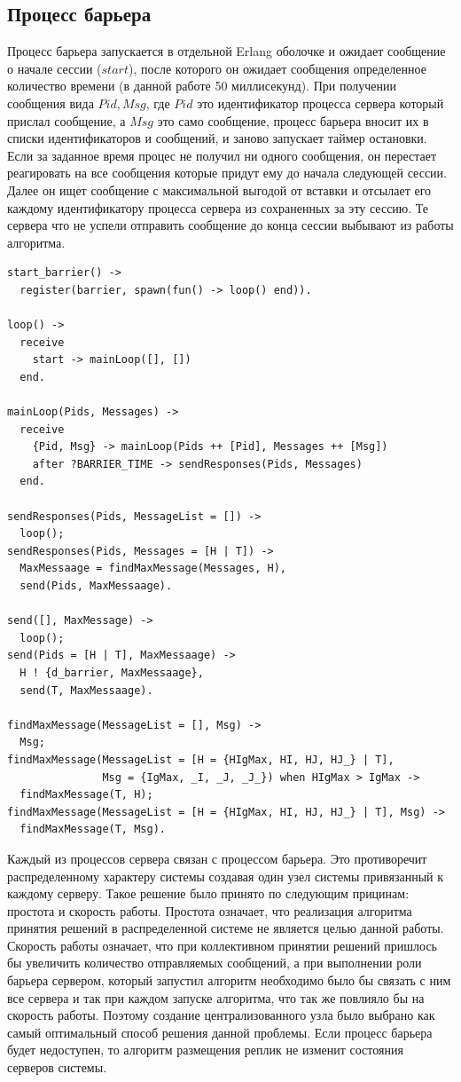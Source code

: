 		\subsection{Процесс барьера}
			Процесс барьера запускается в отдельной Erlang оболочке и ожидает сообщение о начале сессии ($start$), после которого он ожидает сообщения определенное количество времени (в данной 
			работе 50 миллисекунд). При получении сообщения вида ${Pid, Msg}$, где $Pid$ это идентификатор процесса сервера который прислал сообщение, а $Msg$ это само сообщение, процесс барьера 
			вносит их в списки идентификаторов и сообщений, и заново запускает таймер остановки. Если за заданное время процес не получил ни одного сообщения, он перестает реагировать на все 
			сообщения которые придут ему до начала следующей сессии. Далее он ищет сообщение с максимальной выгодой от вставки и отсылает его каждому идентификатору процесса сервера из 
			сохраненных за эту сессию. Те сервера что не успели отправить сообщение до конца сессии выбывают из работы алгоритма.

			\begin{lstlisting}
start_barrier() -> 
  register(barrier, spawn(fun() -> loop() end)).

loop() ->
  receive
    start -> mainLoop([], [])
  end.

mainLoop(Pids, Messages) ->
  receive
    {Pid, Msg} -> mainLoop(Pids ++ [Pid], Messages ++ [Msg])
	after ?BARRIER_TIME -> sendResponses(Pids, Messages)           
  end.	
  
sendResponses(Pids, MessageList = []) -> 
  loop();
sendResponses(Pids, Messages = [H | T]) ->
  MaxMessaage = findMaxMessage(Messages, H),
  send(Pids, MaxMessaage).

send([], MaxMessage) -> 
  loop();
send(Pids = [H | T], MaxMessaage) ->
  H ! {d_barrier, MaxMessaage},
  send(T, MaxMessaage).

findMaxMessage(MessageList = [], Msg) -> 
  Msg;
findMaxMessage(MessageList = [H = {HIgMax, HI, HJ, HJ_} | T], 
               Msg = {IgMax, _I, _J, _J_}) when HIgMax > IgMax -> 
  findMaxMessage(T, H);
findMaxMessage(MessageList = [H = {HIgMax, HI, HJ, HJ_} | T], Msg) -> 
  findMaxMessage(T, Msg).
			\end{lstlisting}

			Каждый из процессов сервера связан с процессом барьера. Это противоречит распределенному характеру системы создавая один узел системы привязанный к каждому серверу. Такое решение 
			было принято по следующим прицинам: простота и скорость работы. Простота означает, что реализация алгоритма принятия решений в распределенной системе не является целью данной работы.
			Скорость работы означает, что при коллективном принятии решений пришлось бы увеличить количество отправляемых сообщений, а при выполнении роли барьера сервером, который запустил 
			алгоритм необходимо было бы связать с ним все сервера и так при каждом запуске алгоритма, что так же повлияло бы на скорость работы. Поэтому создание централизованного узла 
			было выбрано как самый оптимальный способ решения данной проблемы. Если процесс барьера будет недоступен, то алгоритм размещения реплик не изменит состояния серверов системы.

